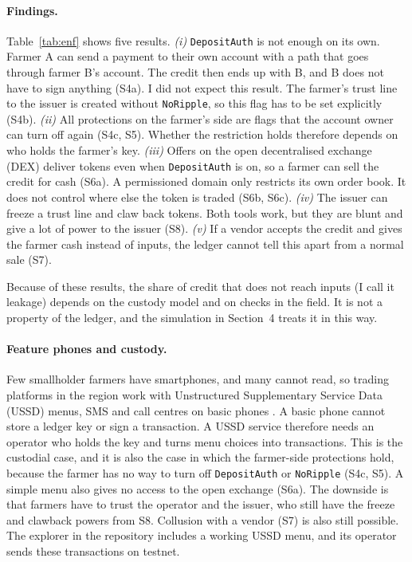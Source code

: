 \documentclass[11pt]{article}
\begin{document}
\paragraph{Findings.} Table~\ref{tab:enf} shows five results.
\textit{(i)} \texttt{DepositAuth} is not enough on its own. Farmer A can send a payment to
their own account with a path that goes through farmer B's account. The credit then ends up
with B, and B does not have to sign anything (S4a). I did not expect this result. The farmer's
trust line to the issuer is created without \texttt{NoRipple}, so this flag has to be set
explicitly (S4b).
\textit{(ii)} All protections on the farmer's side are flags that the account owner can turn
off again (S4c, S5). Whether the restriction holds therefore depends on who holds the farmer's
key.
\textit{(iii)} Offers on the open decentralised exchange (DEX) deliver tokens even when
\texttt{DepositAuth} is on, so a farmer can sell the credit for cash (S6a). A permissioned
domain only restricts its own order book. It does not control where else the token is traded
(S6b, S6c).
\textit{(iv)} The issuer can freeze a trust line and claw back tokens. Both tools work, but
they are blunt and give a lot of power to the issuer (S8).
\textit{(v)} If a vendor accepts the credit and gives the farmer cash instead of inputs, the
ledger cannot tell this apart from a normal sale (S7).

Because of these results, the share of credit that does not reach inputs (I call it leakage)
depends on the custody model and on checks in the field. It is not a property of the ledger,
and the simulation in Section~4 treats it in this way.

\paragraph{Feature phones and custody.} Few smallholder farmers have smartphones, and many
cannot read, so trading platforms in the region work with Unstructured Supplementary Service
Data (USSD) menus, SMS and call centres on basic phones \citep{neza2023}. A basic phone cannot
store a ledger key or sign a transaction. A USSD service therefore needs an operator who holds
the key and turns menu choices into transactions. This is the custodial case, and it is also
the case in which the farmer-side protections hold, because the farmer has no way to turn off
\texttt{DepositAuth} or \texttt{NoRipple} (S4c, S5). A simple menu also gives no access to the
open exchange (S6a). The downside is that farmers have to trust the operator and the issuer,
who still have the freeze and clawback powers from S8. Collusion with a vendor (S7) is also
still possible. The explorer in the repository includes a working USSD menu, and its operator
sends these transactions on testnet.
\end{document}
